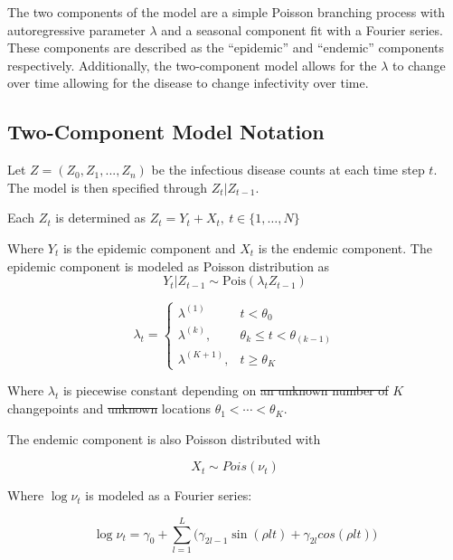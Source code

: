 \documentclass[]{article}
\numberwithin{equation}{section}
\newcommand{\dw}[1]{{\color{red}{#1}}}
\begin{document}
The two components of the model are a simple Poisson branching process
with autoregressive parameter \(\lambda\) and a seasonal component fit
with a Fourier series.  These components are described as the
``epidemic'' and ``endemic'' components respectively. Additionally, the
two-component model allows for the \(\lambda\) to change over time
allowing for the disease to change infectivity over time.

\dw{take some time to describe the model in more simple language - lots of people might not know what a Poisson branching process with an autoregrassive parameter is. YOu can give a plain english description in a paragraph or two}
\hypertarget{two-component-model-notation}{%
\subsection{Two-Component Model
Notation}\label{two-component-model-notation}}

Let \(Z = (Z_0, Z_1, ..., Z_n)\) be the infectious disease counts \dw{counts of what exactly? Use SIR type language} at
each time step \(t\). The model is then specified through
\(Z_t | Z_{t-1}\).

Each \(Z_t\) is determined as \(Z_t = Y_t + X_t,\ t \in \{1,\dots, N\}\)

Where \(Y_t\) is the epidemic component and \(X_t\) is the endemic
component. The epidemic component is modeled as Poisson distribution as
\dw{use text Pois or text Poisson --- change throughout}
\[Y_t|Z_{t-1} \sim \text{Pois}(\lambda_tZ_{t-1})\]

\[ \lambda_t =  \begin{cases} \lambda^{(1)} & t < \theta_0 \\
\lambda^{(k)}, & \theta_{k} \leq t < \theta_{(k-1)} \\
\lambda^{(K+1)}, & t \geq \theta_K \end{cases}\]

Where \(\lambda_t\) is piecewise constant depending on \st{an unknown number
of}  \(K\)  changepoints and \st{unknown} locations
\(\theta_1 < \cdots < \theta_K\). \dw{these are just parts of the model, you talk about the parts you know/will infer later on}

The endemic component is also Poisson distributed with

\[ X_t \sim Pois(\nu_t)\]

Where \(\log{\nu_t}\) is modeled as a Fourier series:

\[ \log{\nu_t} = \gamma_0 + \sum_{l = 1}^L \big(\gamma_{2l-1}\sin(\rho l t)+\gamma_{2l}cos(\rho l t)\big) \]
\end{document}
